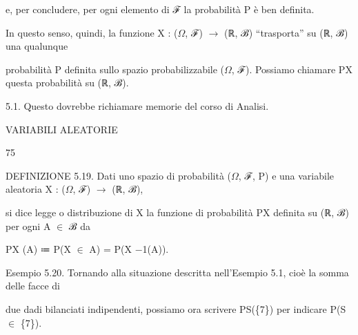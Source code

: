 \documentclass[a4paper,portrait,12pt]{article}
\begin{document}
\begin{flushleft}
e, per concludere, per ogni elemento di ℱ la probabilit\`{a} P \`{e} ben definita.
\end{flushleft}


\begin{flushleft}
In questo senso, quindi, la funzione X : ($\Omega$, ℱ) $\rightarrow$ (ℝ, ℬ) {``}trasporta'' su (ℝ, ℬ) una qualunque
\end{flushleft}


\begin{flushleft}
probabilit\`{a} P definita sullo spazio probabilizzabile ($\Omega$, ℱ). Possiamo chiamare PX questa probabilit\`{a} su (ℝ, ℬ).
\end{flushleft}


\begin{flushleft}
5.1. Questo dovrebbe richiamare memorie del corso di Analisi.
\end{flushleft}





\begin{flushleft}
\newpage
VARIABILI ALEATORIE
\end{flushleft}





75





\begin{flushleft}
DEFINIZIONE 5.19. Dati uno spazio di probabilit\`{a} ($\Omega$, ℱ, P) e una variabile aleatoria X : ($\Omega$, ℱ) $\rightarrow$ (ℝ, ℬ),
\end{flushleft}


\begin{flushleft}
si dice legge o distribuzione di X la funzione di probabilit\`{a} PX definita su (ℝ, ℬ) per ogni A $\in$ ℬ da
\end{flushleft}


\begin{flushleft}
PX (A) ≔ P(X $\in$ A) = P(X $-$1(A)).
\end{flushleft}


\begin{flushleft}
Esempio 5.20. Tornando alla situazione descritta nell'Esempio 5.1, cio\`{e} la somma delle facce di
\end{flushleft}


\begin{flushleft}
due dadi bilanciati indipendenti, possiamo ora scrivere PS(\{7\}) per indicare P(S $\in$ \{7\}).
\end{flushleft}
\end{document}
